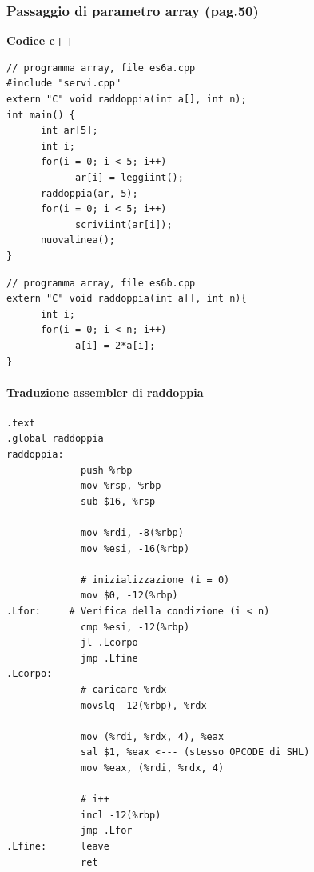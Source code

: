 \documentclass[11pt]{report}
\theoremstyle{definition}
\begin{document}
\subsubsection{Passaggio di parametro array (pag.50)}
\begin{framed}
\noindent \textbf{Codice c++} 
\begin{multicols}{2}
\begin{verbatim}
// programma array, file es6a.cpp
#include "servi.cpp"
extern "C" void raddoppia(int a[], int n);
int main() {
      int ar[5];
      int i;
      for(i = 0; i < 5; i++)
            ar[i] = leggiint();
      raddoppia(ar, 5);
      for(i = 0; i < 5; i++)
            scriviint(ar[i]);
      nuovalinea();
}
\end{verbatim}
\columnbreak
\begin{verbatim}
// programma array, file es6b.cpp
extern "C" void raddoppia(int a[], int n){
      int i;
      for(i = 0; i < n; i++)
            a[i] = 2*a[i]; 
}
\end{verbatim}
\end{multicols}
\end{framed}
\clearpage 
\paragraph{Traduzione assembler di raddoppia}
\begin{verbatim}
.text
.global raddoppia
raddoppia: 
             push %rbp
             mov %rsp, %rbp
             sub $16, %rsp
      
             mov %rdi, -8(%rbp)
             mov %esi, -16(%rbp)
         
             # inizializzazione (i = 0)
             mov $0, -12(%rbp)
.Lfor:     # Verifica della condizione (i < n)
             cmp %esi, -12(%rbp)
             jl .Lcorpo
             jmp .Lfine
.Lcorpo:     
             # caricare %rdx
             movslq -12(%rbp), %rdx
             
             mov (%rdi, %rdx, 4), %eax
             sal $1, %eax <--- (stesso OPCODE di SHL)
             mov %eax, (%rdi, %rdx, 4)
             
             # i++
             incl -12(%rbp)
             jmp .Lfor
.Lfine:      leave
             ret
\end{verbatim}
\end{document}
